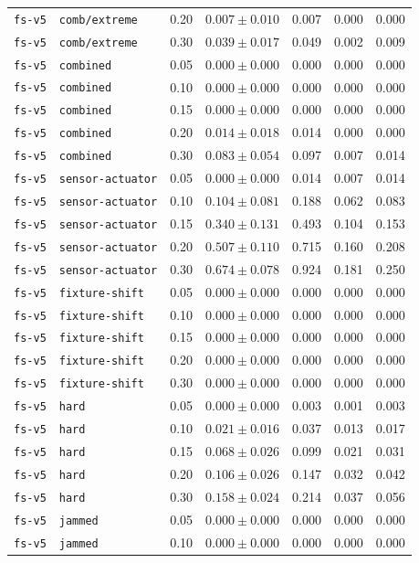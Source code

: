 \documentclass{article}
\begin{document}
\begin{center}
\begin{tabular}{lllcccc}
\texttt{fs-v5} & \texttt{comb/extreme} & 0.20 & $0.007 \pm 0.010$ & 0.007 & 0.000 & 0.000 \\
\texttt{fs-v5} & \texttt{comb/extreme} & 0.30 & $0.039 \pm 0.017$ & 0.049 & 0.002 & 0.009 \\
\texttt{fs-v5} & \texttt{combined} & 0.05 & $0.000 \pm 0.000$ & 0.000 & 0.000 & 0.000 \\
\texttt{fs-v5} & \texttt{combined} & 0.10 & $0.000 \pm 0.000$ & 0.000 & 0.000 & 0.000 \\
\texttt{fs-v5} & \texttt{combined} & 0.15 & $0.000 \pm 0.000$ & 0.000 & 0.000 & 0.000 \\
\texttt{fs-v5} & \texttt{combined} & 0.20 & $0.014 \pm 0.018$ & 0.014 & 0.000 & 0.000 \\
\texttt{fs-v5} & \texttt{combined} & 0.30 & $0.083 \pm 0.054$ & 0.097 & 0.007 & 0.014 \\
\texttt{fs-v5} & \texttt{sensor-actuator} & 0.05 & $0.000 \pm 0.000$ & 0.014 & 0.007 & 0.014 \\
\texttt{fs-v5} & \texttt{sensor-actuator} & 0.10 & $0.104 \pm 0.081$ & 0.188 & 0.062 & 0.083 \\
\texttt{fs-v5} & \texttt{sensor-actuator} & 0.15 & $0.340 \pm 0.131$ & 0.493 & 0.104 & 0.153 \\
\texttt{fs-v5} & \texttt{sensor-actuator} & 0.20 & $0.507 \pm 0.110$ & 0.715 & 0.160 & 0.208 \\
\texttt{fs-v5} & \texttt{sensor-actuator} & 0.30 & $0.674 \pm 0.078$ & 0.924 & 0.181 & 0.250 \\
\texttt{fs-v5} & \texttt{fixture-shift} & 0.05 & $0.000 \pm 0.000$ & 0.000 & 0.000 & 0.000 \\
\texttt{fs-v5} & \texttt{fixture-shift} & 0.10 & $0.000 \pm 0.000$ & 0.000 & 0.000 & 0.000 \\
\texttt{fs-v5} & \texttt{fixture-shift} & 0.15 & $0.000 \pm 0.000$ & 0.000 & 0.000 & 0.000 \\
\texttt{fs-v5} & \texttt{fixture-shift} & 0.20 & $0.000 \pm 0.000$ & 0.000 & 0.000 & 0.000 \\
\texttt{fs-v5} & \texttt{fixture-shift} & 0.30 & $0.000 \pm 0.000$ & 0.000 & 0.000 & 0.000 \\
\texttt{fs-v5} & \texttt{hard} & 0.05 & $0.000 \pm 0.000$ & 0.003 & 0.001 & 0.003 \\
\texttt{fs-v5} & \texttt{hard} & 0.10 & $0.021 \pm 0.016$ & 0.037 & 0.013 & 0.017 \\
\texttt{fs-v5} & \texttt{hard} & 0.15 & $0.068 \pm 0.026$ & 0.099 & 0.021 & 0.031 \\
\texttt{fs-v5} & \texttt{hard} & 0.20 & $0.106 \pm 0.026$ & 0.147 & 0.032 & 0.042 \\
\texttt{fs-v5} & \texttt{hard} & 0.30 & $0.158 \pm 0.024$ & 0.214 & 0.037 & 0.056 \\
\texttt{fs-v5} & \texttt{jammed} & 0.05 & $0.000 \pm 0.000$ & 0.000 & 0.000 & 0.000 \\
\texttt{fs-v5} & \texttt{jammed} & 0.10 & $0.000 \pm 0.000$ & 0.000 & 0.000 & 0.000 \\
\bottomrule
\end{tabular}
\end{center}
\end{document}
